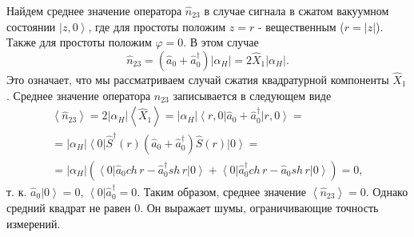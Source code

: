 Найдем среднее значение оператора $\hat{n}_{23}$ в случае сигнала в
сжатом вакуумном состоянии $\left|z, 0\right>$, где для простоты
положим $z = r$ - вещественным ($r = \left|z\right|$). Также для
простоты положим $\varphi = 0$. В этом случае 
\[
\hat{n}_{23} =
\left(\hat{a}_0 + \hat{a}_0^{\dag}\right) \left|\alpha_H\right| = 
2 \hat{X}_1 \left|\alpha_H\right|.
\]
Это означает, что мы рассматриваем случай сжатия квадратурной
компоненты $\hat{X}_1$. Среднее значение оператора $\hat{n}_{23}$
записывается в следующем виде
\begin{eqnarray}
\left<\hat{n}_{23}\right> = 
2 \left|\alpha_H\right|\left<\hat{X}_1\right> = 
\left|\alpha_H\right|\left<r, 0\right|\hat{a}_0 +
\hat{a}_0^{\dag}\left|r, 0\right> =
\nonumber \\
=
\left|\alpha_H\right|\left<0\right|
\hat{S}^{\dag}\left(r\right)
\left(\hat{a}_0 +
\hat{a}_0^{\dag}\right)
\hat{S}\left(r\right)
\left|0\right> =
\nonumber \\
=
\left|\alpha_H\right|
\left(
\left<0\right|
\hat{a}_0 ch\,r -
\hat{a}_0^{\dag} sh\,r
\left|0\right> 
+
\left<0\right|
\hat{a}_0^{\dag} ch\,r -
\hat{a}_0 sh\,r
\left|0\right> 
\right)
= 0,
\nonumber
\end{eqnarray}
т. к. $\hat{a}_0\left|0\right> = 0$, 
$\left<0\right|\hat{a}_0^{\dag} = 0$.
Таким образом, среднее значение $\left<\hat{n}_{23}\right> =
0$. Однако средний квадрат не равен 0. Он выражает шумы, ограничивающие
точность измерений.

